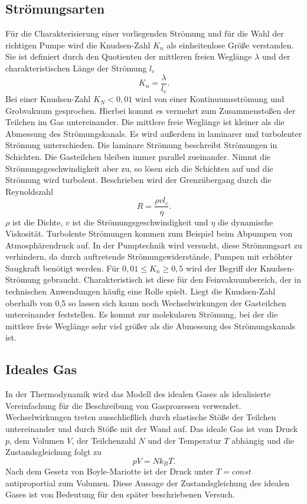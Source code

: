 \subsection{Strömungsarten}
Für die Charakterisierung einer vorliegenden Strömung und für die Wahl der richtigen Pumpe wird die Knudsen-Zahl $K_n$ als einheitenlose Größe verstanden.
Sie ist definiert durch den Quotienten der mittleren freien Weglänge $\lambda$ und der charakteristischen Länge der Strömung $l_c$
\begin{equation}
  K_n=\frac{\lambda}{l_c}.
\end{equation}
Bei einer Knudsen-Zahl $K_N < 0,01$ wird von einer Kontinuumsströmung und Grobvakuum gesprochen. Hierbei kommt es vermehrt zum Zusammenstoßen der Teilchen im Gas
untereinander. Die mittlere freie Weglänge ist kleiner als die Abmessung des Strömungskanals.
Es wird außerdem in laminarer und turbolenter Strömung unterschieden.
Die laminare Strömung beschreibt Strömungen in Schichten. Die Gasteilchen bleiben immer parallel zueinander.
Nimmt die Strömungsgeschwindigkeit aber zu, so lösen sich die Schichten auf und die Strömung wird turbolent.
Beschrieben wird der Grenzübergang durch die Reynoldszahl
\begin{equation}
  R=\frac{\rho v l_c}{\eta}.
\end{equation}
$\rho$ ist die Dichte, $v$ ist die Strömungsgeschwindigkeit und $\eta$ die dynamische Viskosität.
Turbolente Strömungen kommen zum Beispiel beim Abpumpen von Atmosphärendruck auf.
In der Pumptechnik wird versucht, diese Strömungsart zu verhindern, da durch auftretende Strömungswiderstände, Pumpen mit erhöhter Saugkraft benötigt werden.\newline
Für $ 0,01 \leq K_n \geq 0,5$ wird der Begriff der Knudsen-Strömung gebraucht.
Charakteristisch ist diese für den Feinvakuumbereich, der in technischen Anwendungen häufig eine Rolle spielt.\newline
Liegt die Knudsen-Zahl oberhalb von 0,5 so lassen sich kaum noch Wechselwirkungen der Gasteilchen untereinander feststellen.
Es kommt zur molekularen Strömung, bei der die mittlere freie Weglänge sehr viel größer als die Abmessung des Strömungskanals ist.
\subsection{Ideales Gas}
In der Thermodynamik wird das Modell des idealen Gases als idealisierte Vereinfachung für die Beschreibung von Gasprozessen verwendet.
Wechselwirkungen treten ausschließlich durch elastische Stöße der Teilchen untereinander und durch Stöße mit der Wand auf.
Das ideale Gas ist vom Druck $p$, dem Volumen $V$, der Teilchenzahl $N$ und der Temperatur $T$ abhängig und die Zustandsgleichung
folgt zu
\begin{equation}
pV=N k_B T.
\label{eq:idealesgas}
\end{equation}
Nach dem Gesetz von Boyle-Mariotte ist der Druck unter $T=const$ antiproportial zum Volumen.
Diese Aussage der Zustandsgleichung des idealen Gases ist von Bedeutung für den später beschriebenen Versuch.
